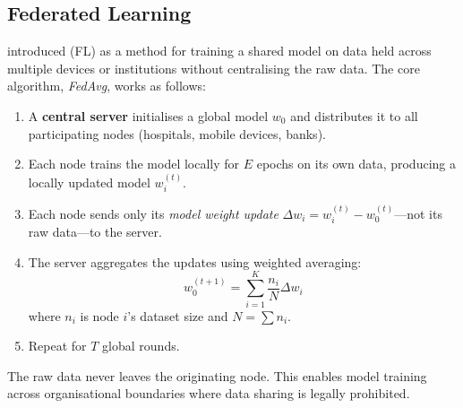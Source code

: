 \subsection{Federated Learning}
\label{subsec:federated-learning}

\autocite{McMahan2017} introduced  (FL) as a
method for training a shared model on data held across multiple devices
or institutions without centralising the raw data. The core algorithm,
\emph{FedAvg}, works as follows:
\begin{enumerate}
  \item A \textbf{central server} initialises a global model $w_0$ and
        distributes it to all participating nodes (hospitals, mobile devices,
        banks).
  \item Each node trains the model locally for $E$ epochs on its own data,
        producing a locally updated model $w_i^{(t)}$.
  \item Each node sends only its \emph{model weight update}
        $\Delta w_i = w_i^{(t)} - w_0^{(t)}$---not its raw data---to
        the server.
  \item The server aggregates the updates using weighted averaging:
        \[
          w_0^{(t+1)} = \sum_{i=1}^{K} \frac{n_i}{N} \Delta w_i
        \]
        where $n_i$ is node $i$'s dataset size and $N = \sum n_i$.
  \item Repeat for $T$ global rounds.
\end{enumerate}

The raw data never leaves the originating node. This enables model training
across organisational boundaries where data sharing is legally prohibited.

